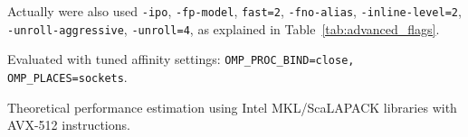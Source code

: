 \begin{table}[H]
{\begin{threeparttable}
    \begin{tablenotes}
        \footnotesize
        \item[1] Actually were also used \texttt{-ipo}, \texttt{-fp-model}, \texttt{fast=2}, \texttt{-fno-alias}, \texttt{-inline-level=2}, \texttt{-unroll-aggressive}, \texttt{-unroll=4}, as explained in Table~\ref{tab:advanced_flags}.
        \item[2] Evaluated with tuned affinity settings: \texttt{OMP\_PROC\_BIND=close, OMP\_PLACES=sockets}.
        \item[3] Theoretical performance estimation using Intel MKL/ScaLAPACK libraries with AVX-512 instructions.
    \end{tablenotes}
  \end{threeparttable}%
}
\end{table}